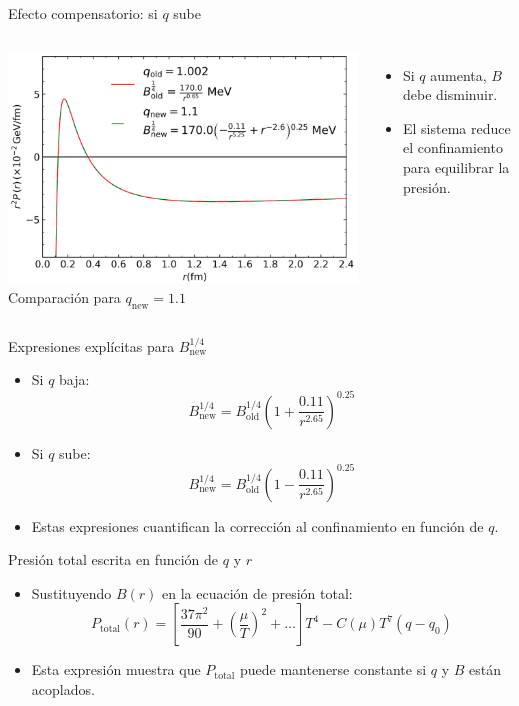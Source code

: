 \documentclass{beamer}
\begin{document}
\begin{frame}{Efecto compensatorio: si \( q \) sube}
  \begin{columns}
    \includegraphics[width=\linewidth]{figures/If-q-up.png}
    \vspace{0.1cm}
    \centering \scriptsize{Comparación para \( q_{\text{new}} = 1.1 \)}

    \begin{itemize}
      \item Si \( q \) aumenta, \( B \) debe disminuir.
      \item El sistema reduce el confinamiento para equilibrar la presión.
    \end{itemize}
  \end{columns}
\end{frame}

\begin{frame}{Expresiones explícitas para \( B^{1/4}_{\text{new}} \)}
  \begin{itemize}
    \item Si \( q \) baja:
    \[
      B^{1/4}_{\text{new}} = B^{1/4}_{\text{old}} \left( 1 + \frac{0.11}{r^{2.65}} \right)^{0.25}
    \]
    \item Si \( q \) sube:
    \[
      B^{1/4}_{\text{new}} = B^{1/4}_{\text{old}} \left( 1 - \frac{0.11}{r^{2.65}} \right)^{0.25}
    \]
    \item Estas expresiones cuantifican la corrección al confinamiento en función de \( q \).
  \end{itemize}
\end{frame}

\begin{frame}{Presión total escrita en función de \( q \) y \( r \)}
  \begin{itemize}
    \item Sustituyendo \( B(r) \) en la ecuación de presión total:
    \[
      P_{\text{total}}(r) = \left[ \frac{37\pi^2}{90} + \left( \frac{\mu}{T} \right)^2 + \dots \right] T^4
      - C(\mu) T^7 (q - q_0)
    \]
    \item Esta expresión muestra que \( P_{\text{total}} \) puede mantenerse constante si \( q \) y \( B \) están acoplados.
  \end{itemize}
\end{frame}
\end{document}
